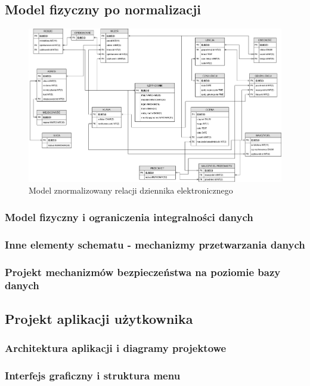 \documentclass[12pt]{article}
\begin{document}
\begin{landscape}
\newpage
\subsection{Model fizyczny po normalizacji}

\begin{figure}[h!]
    \centering
    \includegraphics[scale=0.42]{MZnormalizowany.png}
    \caption{Model znormalizowany relacji dziennika elektronicznego}
    \label{fig:mf}
\end{figure}

\end{landscape}
\clearpage

\subsubsection{Model fizyczny i ograniczenia integralności danych}

\subsubsection{Inne elementy schematu - mechanizmy przetwarzania danych}
\subsubsection{Projekt mechanizmów bezpieczeństwa na poziomie bazy danych}
\subsection{Projekt aplikacji użytkownika}
\subsubsection{Architektura aplikacji i diagramy projektowe}
\subsubsection{Interfejs graficzny i struktura menu}
\end{document}
